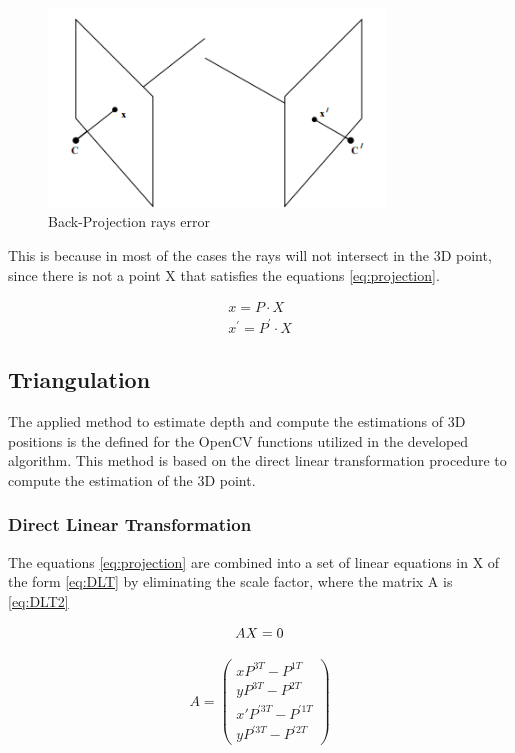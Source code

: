 \begin{figure}[h]
    \centering
   \includegraphics[width=0.8\textwidth]{figures/back_projection}
    \caption{Back-Projection rays error}
    \label{fig:Back-Projection}
\end{figure}

This is because in most of the cases the rays will not intersect in the 3D point, since there is not a point X that satisfies the equations \ref{eq:projection}. 

\begin{align}
	x  = P·X \nonumber \\
	x^{'} = P^{'}·X
	\label{eq:projection}
\end{align} 

\subsection{Triangulation}
The applied method to estimate depth and compute the estimations of 3D positions is the defined for the OpenCV functions utilized in the developed algorithm. 
This method is based on the direct linear transformation procedure to compute the estimation of the 3D point.

\subsubsection{Direct Linear Transformation}
The equations \ref{eq:projection} are combined into a set of linear equations in X of the form \ref{eq:DLT} by eliminating the scale factor, where the matrix A is \ref{eq:DLT2}

\begin{equation}
	\centering
	AX = 0 
	\label{eq:DLT}
\end{equation}

\begin{equation}
A =
 \begin{pmatrix}
  xP^{3T} - P^{1T} \\
  yP^{3T} - P^{2T} \\
  x'P^{'3T} - P^{'1T} \\
  yP^{'3T} - P^{'2T}
 \end{pmatrix}
 \label{eq:DLT2}
\end{equation}


